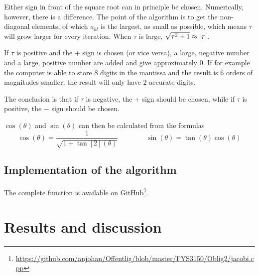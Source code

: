 \documentclass[12pt,english,a4paper]{report}
\begin{document}
Either sign in front of the square root can in principle be chosen. Numerically, however, there is a difference. The point of the algorithm is to get the non-diagonal elements, of which \(a_{kl}\) is the largest, as small as possible, which means \(\tau\) will grow larger for every iteration. When \(\tau\) is large, \(\sqrt{\tau^2+1}\approx\abs{\tau}\).

If \(\tau\) is positive and the \(+\) sign is chosen (or vice versa), a large, negative number and a large, positive number are added and give approximately \(0\). If for example the computer is able to store \(8\) digits in the mantissa and the result is \(6\) orders of magnitudes smaller, the result will only have \(2\) accurate digits.

The conclusion is that if \(\tau\) is negative, the \(+\) sign should be chosen, while if \(\tau\) is positive, the \(-\) sign should be chosen.

\(\cos(\theta)\) and \(\sin(\theta)\) can then be calculated from the formulas
\[
\cos(\theta)=\frac{1}{\sqrt{1+\tan[2](\theta)}}\qquad\qquad \sin(\theta)=\tan(\theta)\cos(\theta)
\]

\clearpage
\subsection{Implementation of the algorithm}
The complete function is available on GitHub\footnote{\url{https://github.com/anjohan/Offentlig/blob/master/FYS3150/Oblig2/jacobi.cpp}}.




%


\section{Results and discussion}
\end{document}
